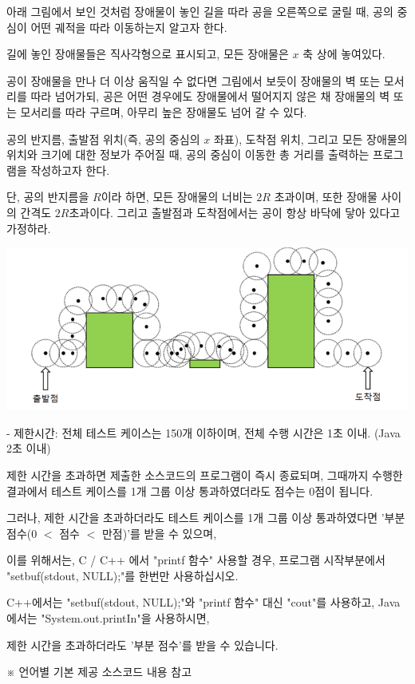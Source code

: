 \documentclass [12pt] {oblivoir}
\begin{document}
아래 그림에서 보인 것처럼 장애물이 놓인 길을 따라 공을 오른쪽으로 굴릴 때, 공의 중심이 어떤 궤적을 따라 이동하는지 알고자 한다.

길에 놓인 장애물들은 직사각형으로 표시되고, 모든 장애물은 $x$ 축 상에 놓여있다.

공이 장애물을 만나 더 이상 움직일 수 없다면 그림에서 보듯이 장애물의 벽 또는 모서리를 따라 넘어가되, 공은 어떤 경우에도 장애물에서 떨어지지 않은 채 장애물의 벽 또는 모서리를 따라 구르며, 아무리 높은 장애물도 넘어 갈 수 있다.

공의 반지름, 출발점 위치(즉, 공의 중심의 $x$ 좌표), 도착점 위치, 그리고 모든 장애물의 위치와 크기에 대한 정보가 주어질 때, 공의 중심이 이동한 총 거리를 출력하는 프로그램을 작성하고자 한다.

단, 공의 반지름을 $R$이라 하면, 모든 장애물의 너비는 $2R$ 초과이며, 또한 장애물 사이의 간격도 $2R$초과이다. 그리고 출발점과 도착점에서는 공이 항상 바닥에 닿아 있다고 가정하라.

\includegraphics{n2.png}

- 제한시간: 전체 테스트 케이스는 150개 이하이며, 전체 수행 시간은 1초 이내. (Java 2초 이내)

제한 시간을 초과하면 제출한 소스코드의 프로그램이 즉시 종료되며, 그때까지 수행한 결과에서 테스트 케이스를 1개 그룹 이상 통과하였더라도 점수는 0점이 됩니다.

그러나, 제한 시간을 초과하더라도 테스트 케이스를 1개 그룹 이상 통과하였다면 '부분 점수(0 $<$ 점수 $<$ 만점)'를 받을 수 있으며,

이를 위해서는, C / C++ 에서 "printf 함수" 사용할 경우, 프로그램 시작부분에서 "setbuf(stdout, NULL);"를 한번만 사용하십시오.

C++에서는 "setbuf(stdout, NULL);"와 "printf 함수" 대신 "cout"를 사용하고, Java에서는 "System.out.printIn"을 사용하시면,

제한 시간을 초과하더라도 '부분 점수'를 받을 수 있습니다.

※ 언어별 기본 제공 소스코드 내용 참고
\end{document}
